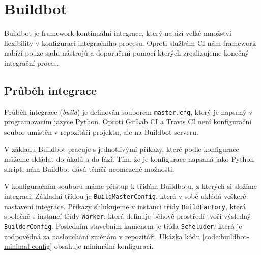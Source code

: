 \section{Buildbot}

Buildbot je framework kontinuální integrace, který nabízí velké množství flexibility v konfiguraci integračního procesu.
Oproti službám CI nám framework nabízí pouze sadu nástrojů a doporučení pomocí kterých zrealizujeme konečný integrační proces.

\subsection{Průběh integrace}

Průběh integrace (\textit{build}) je definován souborem \verb|master.cfg|, který je napsaný v programovacím jazyce Python.
Oproti GitLab CI a Travis CI není konfigurační soubor umístěn v repozitáři projektu, ale na Buildbot serveru.

V základu Buildbot pracuje s jednotlivými příkazy, které podle konfigurace můžeme skládat do úkolů a do fází.
Tím, že je konfigurace napsaná jako Python skript, nám Buildbot dává téměř neomezené možnosti.

V konfiguračním souboru máme přístup k třídám Buildbotu, z kterých si složíme integraci.
Základní třídou je \verb|BuildMasterConfig|, která v sobě ukládá veškeré nastavení integrace.
Příkazy shlukujeme v instanci třídy \verb|BuildFactory|, která společně s instancí třídy \verb|Worker|, která definuje běhové prostředí tvoří výsledný \verb|BuilderConfig|.
Posledním stavebním kamenem je třída \verb|Scheluder|, která je zodpovědná za naslouchání změnám v repozitáři.
Ukázka kódu \ref{code:buildbot-minimal-config} obsahuje minimální konfiguraci.

